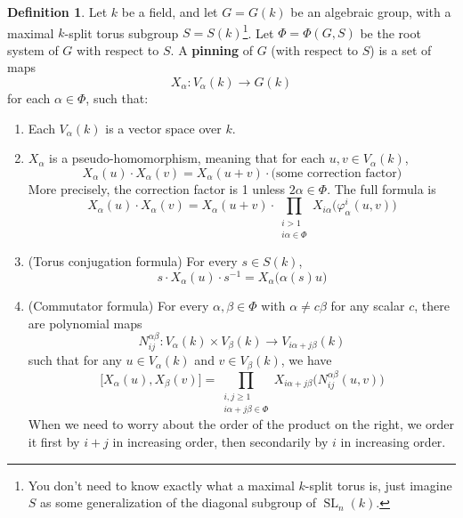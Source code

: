 \documentclass[12pt]{article}
\theoremstyle{definition}
\newtheorem{definition}[theorem]{Definition}
\newcommand{\tbf}{\textbf}
\newcommand{\inv}{^{-1}}
\DeclareMathOperator{\SL}{SL}
\begin{document}
\begin{definition}
Let $k$ be a field, and let $G = G(k)$ be an algebraic group, with a maximal $k$-split torus subgroup $S = S(k)$\footnote{You don't need to know exactly what a maximal $k$-split torus is, just imagine $S$ as some generalization of the diagonal subgroup of $\SL_n(k)$.}. Let $\Phi = \Phi(G,S)$ be the root system of $G$ with respect to $S$. A \tbf{pinning} of $G$ (with respect to $S$) is a set of maps
\[
	X_\alpha:V_\alpha(k) \to G(k)
\]
for each $\alpha \in \Phi$, such that:
\begin{enumerate}
	\item Each $V_\alpha(k)$ is a vector space over $k$.
	\item $X_\alpha$ is a pseudo-homomorphism, meaning that for each $u,v \in V_\alpha(k)$,
	\[
		X_\alpha(u) \cdot X_\alpha(v) = X_\alpha(u+v) \cdot \Big( \text{some correction factor} \Big)
	\]
	More precisely, the correction factor is 1 unless $2\alpha \in \Phi$. The full formula is
	\[
		X_\alpha(u) \cdot X_\alpha(v) = X_\alpha(u+v) \cdot \prod_{\substack{i > 1 \\ i\alpha \in \Phi}} X_{i\alpha}\Big(\varphi_\alpha^i(u,v) \Big)
	\]
	\item (Torus conjugation formula) For every $s \in S(k)$, 
	\[
		s \cdot X_\alpha(u) \cdot s \inv = X_\alpha \Big( \alpha(s) u \Big)
	\]
	\item (Commutator formula) For every $\alpha, \beta \in \Phi$ with $\alpha \neq c \beta$ for any scalar $c$, there are polynomial maps
	\[
		N_{ij}^{\alpha \beta}:V_\alpha(k) \times V_\beta(k) \to V_{i\alpha+j\beta}(k)
	\]
	such that for any $u \in V_\alpha(k)$ and $v \in V_\beta(k)$, we have
	\[
		\Big[ X_\alpha(u), X_\beta(v) \Big] = \prod_{\substack{i, j \ge 1 \\ i\alpha+j\beta \in \Phi}} X_{i \alpha+j\beta} \Big( N_{ij}^{\alpha \beta}(u,v) \Big)
	\]
	When we need to worry about the order of the product on the right, we order it first by $i+j$ in increasing order, then secondarily by $i$ in increasing order.
\end{enumerate}
\end{definition}
\end{document}
